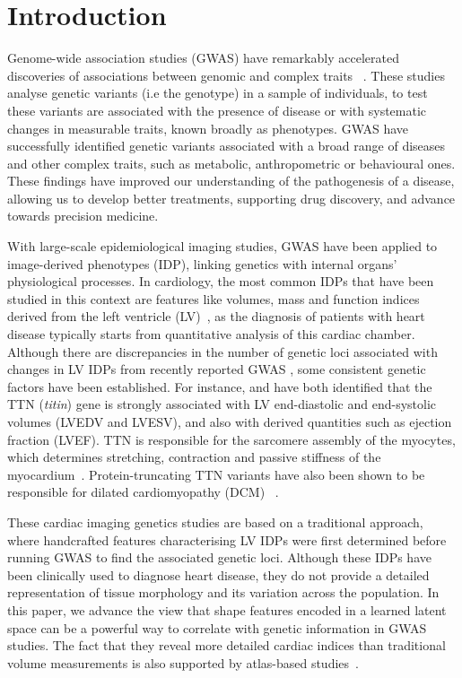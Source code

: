 \section*{Introduction}
Genome-wide association studies (GWAS) have remarkably accelerated discoveries of associations between genomic and complex traits ~\cite{ref_gwas_review}. These studies analyse genetic variants (i.e the genotype) in a sample of individuals, to test these variants are associated with the presence of disease or with systematic changes in measurable traits, known broadly as phenotypes. GWAS have successfully identified genetic variants associated with a broad range of diseases and other complex traits, such as metabolic, anthropometric or behavioural ones. These findings have improved our understanding of the pathogenesis of a disease, allowing us to develop better treatments, supporting drug discovery, and advance towards precision medicine.

With large-scale epidemiological imaging studies, GWAS have been applied to image-derived phenotypes (IDP), linking genetics with internal organs' physiological processes. In cardiology, the most common IDPs that have been studied in this context are features like volumes, mass and function indices derived from the left ventricle (LV)~\cite{ref_nayaung, ref_biffi}, as the diagnosis of patients with heart disease typically starts from quantitative analysis of this cardiac chamber. Although there are discrepancies in the number of genetic loci associated with changes in LV IDPs from recently reported GWAS \cite{ref_nayaung, ref_pirruccello, ref_biffi}, some consistent genetic factors have been established. 
For instance, \cite{ref_nayaung} and \cite{ref_pirruccello} have both identified that the TTN ({\em titin}) gene is strongly associated with LV end-diastolic and end-systolic volumes (LVEDV and LVESV), and also with derived quantities such as ejection fraction (LVEF). TTN is responsible for the sarcomere assembly of the myocytes, which determines stretching, contraction and passive stiffness of the myocardium~\cite{granzier_giant_2004}. Protein-truncating TTN variants have also been shown to be responsible for dilated cardiomyopathy (DCM) ~\cite{tayal_phenotype_2017}.

These cardiac imaging genetics studies are based on a traditional approach, where handcrafted features characterising LV IDPs were first determined before running GWAS to find the associated genetic loci. Although these IDPs have been clinically used to diagnose heart disease, they do not provide a detailed representation of tissue morphology and its variation across the population. In this paper, we advance the view that shape features encoded in a learned latent space can be a powerful way to correlate with genetic information in GWAS studies. The fact that they reveal more detailed cardiac indices than traditional volume measurements is also supported by atlas-based studies~\cite{gilbert_independent_2019, medrano-gracia_left_2014}.

